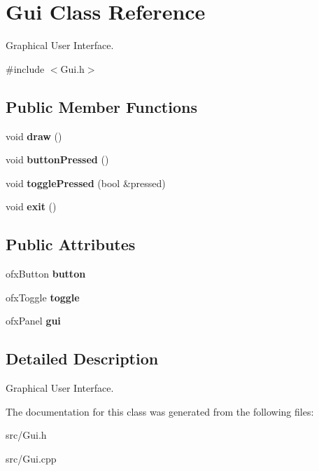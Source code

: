 \hypertarget{classGui}{}\section{Gui Class Reference}
\label{classGui}


Graphical User Interface.  




{\ttfamily \#include $<$Gui.\+h$>$}

\subsection*{Public Member Functions}
\begin{DoxyCompactItemize}
\item 
void {\bfseries draw} ()\hypertarget{classGui_a51dbe7d00fcc9154b2ed1b181668d2db}{}\label{classGui_a51dbe7d00fcc9154b2ed1b181668d2db}

\item 
void {\bfseries button\+Pressed} ()\hypertarget{classGui_a012766edbe7b63bb0a334d0dc0a20acf}{}\label{classGui_a012766edbe7b63bb0a334d0dc0a20acf}

\item 
void {\bfseries toggle\+Pressed} (bool \&pressed)\hypertarget{classGui_abcd8b5e32f522560f4f8672a9a30b174}{}\label{classGui_abcd8b5e32f522560f4f8672a9a30b174}

\item 
void {\bfseries exit} ()\hypertarget{classGui_a6748646c37e27710a82d5413b4169469}{}\label{classGui_a6748646c37e27710a82d5413b4169469}

\end{DoxyCompactItemize}
\subsection*{Public Attributes}
\begin{DoxyCompactItemize}
\item 
ofx\+Button {\bfseries button}\hypertarget{classGui_a8179cc8b574ae41c79b5df59ceac9505}{}\label{classGui_a8179cc8b574ae41c79b5df59ceac9505}

\item 
ofx\+Toggle {\bfseries toggle}\hypertarget{classGui_a5982f21b03c99e1acb237cf1e9eae13e}{}\label{classGui_a5982f21b03c99e1acb237cf1e9eae13e}

\item 
ofx\+Panel {\bfseries gui}\hypertarget{classGui_aa383c046993cb66c31d30819c3a4addd}{}\label{classGui_aa383c046993cb66c31d30819c3a4addd}

\end{DoxyCompactItemize}


\subsection{Detailed Description}
Graphical User Interface. 

The documentation for this class was generated from the following files\+:\begin{DoxyCompactItemize}
\item 
src/Gui.\+h\item 
src/Gui.\+cpp\end{DoxyCompactItemize}
